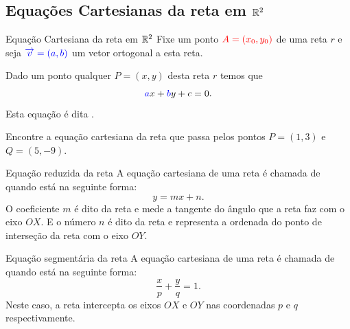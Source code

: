 \subsection*{Equações Cartesianas da reta em $\mathbb{R}^2$}
\begin{frame}[label=retas]{Equação Cartesiana da reta em $\mathbb{R}^2$}
	Fixe um ponto $\textcolor{red}{A=(x_0,y_0)}$ de uma reta $r$ e seja  $\textcolor{blue}{\overrightarrow{v}=(a,b)}$ um vetor ortogonal a esta reta. 
	
		\begin{center}
	\end{center}
	
Dado um ponto qualquer   $P=(x,y)$	desta reta $r$  temos que
		\[	\textcolor{blue}{a}x+\textcolor{blue}{b}y+c=0.\]
Esta equação é dita .
\end{frame}
	
\begin{frame}[label=retas]
	\begin{exe}\noindent
  Encontre a equação cartesiana da reta que passa pelos pontos $P=(1,3)$ e $Q=(5,-9)$.
	\end{exe}

	\begin{block}{Equação reduzida da reta}
		A equação cartesiana de uma reta é chamada de    quando  está na seguinte forma:
		\[y=mx+n.\]
		O coeficiente  $m$ é dito  da reta e mede a tangente do ângulo que a reta faz com o eixo $OX$. E o número $n$ é dito  da reta e representa a ordenada do ponto de interseção da reta com o eixo $OY$.
	\end{block}

\end{frame}

\begin{frame}
	
	\begin{block}{Equação segmentária da reta}
		A equação cartesiana de uma reta é chamada de     quando  está na seguinte forma:
		\[\frac{x}{p}+\frac{y}{q}=1.\]
		Neste caso, a reta intercepta os eixos $OX$ e $OY$ nas coordenadas $p$ e $q$ respectivamente. 
	\end{block}
	
\end{frame}

